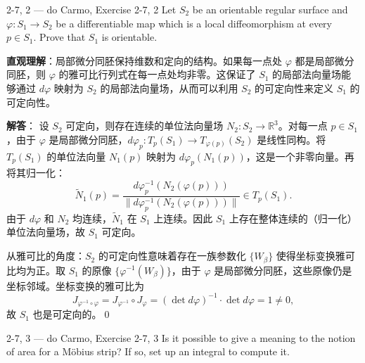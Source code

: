 \begin{exercise}{2-7, 2 — do Carmo, Exercise 2-7, 2}
Let $S_2$ be an orientable regular surface and $\varphi: S_1 \to S_2$ be a differentiable map which is a local diffeomorphism at every $p \in S_1$. Prove that $S_1$ is orientable.
\end{exercise}

\begin{solution}
\textbf{直观理解}：局部微分同胚保持维数和定向的结构。如果每一点处 $\varphi$ 都是局部微分同胚，则 $\varphi$ 的雅可比行列式在每一点处均非零。这保证了 $S_1$ 的局部法向量场能够通过 $d\varphi$ 映射为 $S_2$ 的局部法向量场，从而可以利用 $S_2$ 的可定向性来定义 $S_1$ 的可定向性。

\textbf{解答}：
设 $S_2$ 可定向，则存在连续的单位法向量场 $N_2: S_2 \to \mathbb{R}^3$。对每一点 $p \in S_1$，由于 $\varphi$ 是局部微分同胚，$d\varphi_p: T_p(S_1) \to T_{\varphi(p)}(S_2)$ 是线性同构。将 $T_p(S_1)$ 的单位法向量 $N_1(p)$ 映射为 $d\varphi_p(N_1(p))$，这是一个非零向量。再将其归一化：
\[
\tilde{N}_1(p) = \frac{d\varphi_p^{-1}(N_2(\varphi(p)))}{\|d\varphi_p^{-1}(N_2(\varphi(p)))\|} \in T_p(S_1).
\]
由于 $d\varphi$ 和 $N_2$ 均连续，$\tilde{N}_1$ 在 $S_1$ 上连续。因此 $S_1$ 上存在整体连续的（归一化）单位法向量场，故 $S_1$ 可定向。

从雅可比的角度：$S_2$ 的可定向性意味着存在一族参数化 $\{W_\beta\}$ 使得坐标变换雅可比均为正。取 $S_1$ 的原像 $\{\varphi^{-1}(W_\beta)\}$，由于 $\varphi$ 是局部微分同胚，这些原像仍是坐标邻域。坐标变换的雅可比为
\[
J_{\varphi^{-1}\circ\varphi} = J_{\varphi^{-1}} \circ J_{\varphi} = (\det d\varphi)^{-1} \cdot \det d\varphi = 1 \neq 0,
\]
故 $S_1$ 也是可定向的。\qed
\end{solution}

\begin{exercise}{2-7, 3 — do Carmo, Exercise 2-7, 3}
Is it possible to give a meaning to the notion of area for a Möbius strip? If so, set up an integral to compute it.
\end{exercise}

